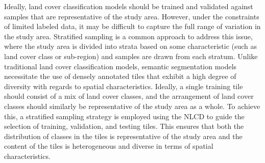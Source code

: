 Ideally, land cover classification models should be trained and validated against samples that are representative of the study area. 
However, under the constraints of limited labeled data, it may be difficult to capture the full range of variation in the study area. 
Stratified sampling is a common approach to address this issue, where the study area is divided into strata based on some characteristic (such as land cover class or sub-region) and samples are drawn from each stratum.
Unlike traditional land cover classification models, semantic segmentation models necessitate the use of densely annotated tiles that exhibit a high degree of diversity with regards to spatial characteristics.
Ideally, a single training tile should consist of a mix of land cover classes, and the arrangement of land cover classes should similarly be representative of the study area as a whole.
To achieve this, a stratified sampling strategy is employed using the NLCD to guide the selection of training, validation, and testing tiles.
This ensures that both the distribution of classes in the tiles is representative of the study area and the content of the tiles is heterogeneous and diverse in terms of spatial characteristics.

